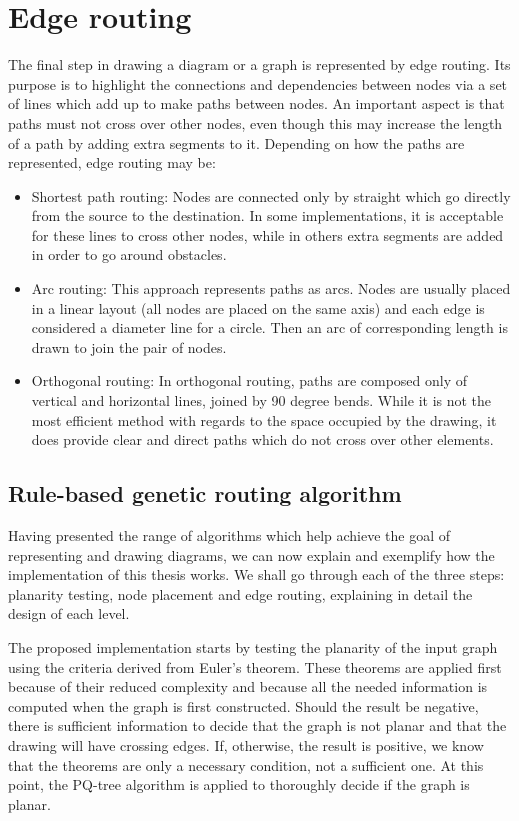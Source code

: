 \section{Edge routing}

The final step in drawing a diagram or a graph is represented by edge routing. Its purpose is to highlight the connections and dependencies between 
nodes via a set of lines which add up to make paths between nodes. An important aspect is that paths must not cross over other nodes, even though 
this may increase the length of a path by adding extra segments to it. Depending on how the paths are represented, edge routing may be:

\begin{itemize}

\item Shortest path routing: Nodes are connected only by straight which go directly from the source to the destination. In some implementations, it 
is acceptable for these lines to cross other nodes, while in others extra segments are added in order to go around obstacles.
\item Arc routing: This approach represents paths as arcs. Nodes are usually placed in a linear layout (all nodes are placed on the same axis) and 
each edge is considered a diameter line for a circle. Then an arc of corresponding length is drawn to join the pair of nodes.
\item Orthogonal routing: In orthogonal routing, paths are composed only of vertical and horizontal lines, joined by 90 degree bends. While it is 
not the most efficient method with regards to the space occupied by the drawing, it does provide clear and direct paths which do not cross over other elements.

\end{itemize}

\subsection{Rule-based genetic routing algorithm}

Having presented the range of algorithms which help achieve the goal of representing and drawing diagrams, we can now explain and exemplify how 
the implementation of this thesis works. We shall go through each of the three steps: planarity testing, node placement and edge routing, explaining in detail the design of each level.

The proposed implementation starts by testing the planarity of the input graph using the criteria derived from Euler's theorem. These theorems are 
applied first because of their reduced complexity and because all the needed information is computed when the graph is first constructed. Should the 
result be negative, there is sufficient information to decide that the graph is not planar and that the drawing will have crossing edges. 
If, otherwise, the result is positive, we know that the theorems are only a necessary condition, not a sufficient one. At this point, the PQ-tree 
algorithm is applied to thoroughly decide if the graph is planar.

